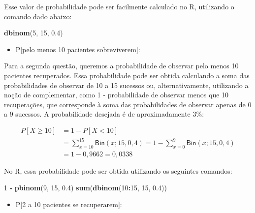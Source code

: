 \documentclass[
]{book}
\newenvironment{Shaded}{\begin{snugshade}}{\end{snugshade}}
\newcommand{\DecValTok}[1]{\textcolor[rgb]{0.00,0.00,0.81}{#1}}
\newcommand{\FloatTok}[1]{\textcolor[rgb]{0.00,0.00,0.81}{#1}}
\newcommand{\KeywordTok}[1]{\textcolor[rgb]{0.13,0.29,0.53}{\textbf{#1}}}
\newcommand{\NormalTok}[1]{#1}
\newcommand{\OperatorTok}[1]{\textcolor[rgb]{0.81,0.36,0.00}{\textbf{#1}}}
\newcommand{\StringTok}[1]{\textcolor[rgb]{0.31,0.60,0.02}{#1}}
\providecommand{\tightlist}{%
  \setlength{\itemsep}{0pt}\setlength{\parskip}{0pt}}
\theoremstyle{definition}
\theoremstyle{definition}
\theoremstyle{definition}
\theoremstyle{remark}
\begin{document}
Esse valor de probabilidade pode ser facilmente calculado no R, utilizando o comando dado abaixo:

\begin{Shaded}
\begin{Highlighting}[]
\KeywordTok{dbinom}\NormalTok{(}\DecValTok{5}\NormalTok{, }\DecValTok{15}\NormalTok{, }\FloatTok{0.4}\NormalTok{)}
\end{Highlighting}
\end{Shaded}

\begin{itemize}
\tightlist
\item
  P{[}pelo menos 10 pacientes sobreviverem{]}:
\end{itemize}

Para a segunda questão, queremos a probabilidade de observar pelo menos 10 pacientes recuperados. Essa probabilidade pode ser obtida calculando a soma das probabilidades de observar de 10 a 15 sucessos ou, alternativamente, utilizando a noção de complementar, como 1 - probabilidade de observar menos que 10 recuperações, que corresponde à soma das probabilidades de observar apenas de 0 a 9 sucessos. A probabilidade desejada é de aproximadamente 3\%:

\begin{align*}
  P[X \geq 10] &= 1 - P[X < 10] \\
               &= \sum_{x=10}^{15}\textsf{Bin}(x; 15, 0,4) = 1 - \sum_{x=0}^{9}\textsf{Bin}(x; 15, 0,4) \\
               &= 1 - 0,9662 = 0,0338
\end{align*}

No R, essa probabilidade pode ser obtida utilizando os seguintes comandos:

\begin{Shaded}
\begin{Highlighting}[]
\DecValTok{1} \OperatorTok{-}\StringTok{ }\KeywordTok{pbinom}\NormalTok{(}\DecValTok{9}\NormalTok{, }\DecValTok{15}\NormalTok{, }\FloatTok{0.4}\NormalTok{)  }
\KeywordTok{sum}\NormalTok{(}\KeywordTok{dbinom}\NormalTok{(}\DecValTok{10}\OperatorTok{:}\DecValTok{15}\NormalTok{, }\DecValTok{15}\NormalTok{, }\FloatTok{0.4}\NormalTok{))}
\end{Highlighting}
\end{Shaded}

\begin{itemize}
\tightlist
\item
  P{[}2 a 10 pacientes se recuperarem{]}:
\end{itemize}
\end{document}
